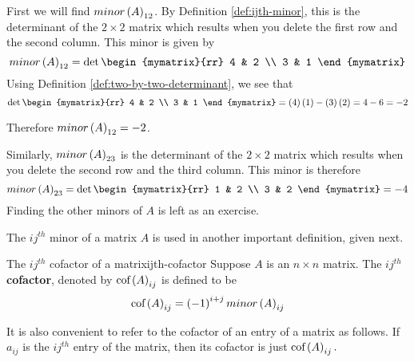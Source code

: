 \begin{solution} First we will find $minor\left(A\right) _{12}$. By Definition
\ref{def:ijth-minor}, this is the determinant of the $2\times 2$ matrix
which results when you delete the first row and the second column. This
minor is given by
\begin{equation*}
minor \tup{A}_{12}
=
\det \begin{mymatrix}{rr}
4 & 2 \\
3 & 1
\end{mymatrix}
\end{equation*}
Using Definition \ref{def:two-by-two-determinant}, we see that 
\begin{equation*}
\det \begin{mymatrix}{rr}
4 & 2 \\
3 & 1
\end{mymatrix} = \tup{4}\tup{1} - \tup{3}\tup{2} = 4 - 6 = -2
\end{equation*}

Therefore $minor \left(A\right)_{12} = -2$. 

Similarly, $minor\left(A\right)_{23}$ is the determinant of the $2\times 2$ matrix
which results when you delete the second row and the third column. This
minor is therefore
\begin{equation*}
minor \tup{A}_{23} 
=
\det \begin{mymatrix}{rr}
1 & 2 \\
3 & 2
\end{mymatrix} = -4
\end{equation*}
Finding the other minors of $A$ is left as an exercise. 
\end{solution}

The $ij^{th}$ minor of a matrix $A$ is used in another important definition, given next.

\begin{definition}{The $ij^{th}$ cofactor of a matrix}{ijth-cofactor}
Suppose $A$ is an $n\times n$ matrix. The $ij^{th}$ \textbf{cofactor}, denoted by $\mbox{\rm cof}\left(A\right) _{ij}$ is
defined to be 
\begin{equation*}
\mbox{\rm cof}\left(A\right) _{ij} = \left(-1\right) ^{i+j} minor\left(A\right)_{ij} 
\end{equation*}
\end{definition}

It is also convenient to refer to the
cofactor of an entry of a matrix as follows. If $a_{ij}$ is the $ij^{th}$ entry of the
matrix, then its cofactor is just $\mbox{\rm cof}\left(A\right) _{ij}.$

